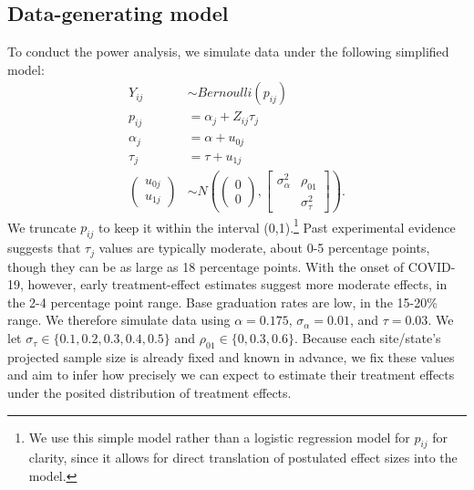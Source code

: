 \documentclass[]{article}
\begin{document}
\subsection{Data-generating model}

To conduct the power analysis, we simulate data under the following simplified model:
\begin{align*}
    Y_{ij} &\sim Bernoulli(p_{ij}) \\
    p_{ij} &= \alpha_j + Z_{ij} \tau_j \\
    \alpha_j &= \alpha + u_{0j} \\
	\tau_j &= \tau + u_{1j} \\
	\begin{pmatrix}
		u_{0j} \\ u_{1j}
	\end{pmatrix} &\sim N\left(
	\begin{pmatrix}
		0 \\ 0
	\end{pmatrix}, 
	\begin{bmatrix}
		\sigma^2_\alpha & \rho_{01} \\  & \sigma^2_\tau
	\end{bmatrix}\right).
\end{align*}
We truncate $p_{ij}$ to keep it within the interval (0,1).\footnote{We use this simple model rather than a logistic regression model for $p_{ij}$ for clarity, since it allows for direct translation of postulated effect sizes into the model.}
Past experimental evidence suggests that $\tau_j$ values are typically moderate, about 0-5 percentage points, though they can be as large as 18 percentage points.
With the onset of COVID-19, however, early treatment-effect estimates suggest more moderate effects, in the 2-4 percentage point range.
Base graduation rates are low, in the 15-20\% range.
We therefore simulate data using $\alpha = 0.175$, $\sigma_\alpha=0.01$, and $\tau=0.03$.
We let $\sigma_\tau \in \{0.1, 0.2, 0.3, 0.4, 0.5\}$ and $\rho_{01} \in \{0, 0.3, 0.6\}$.
Because each site/state's projected sample size is already fixed and known in advance, we fix these values and aim to infer how precisely we can expect to estimate their treatment effects under the posited distribution of treatment effects.
\end{document}
